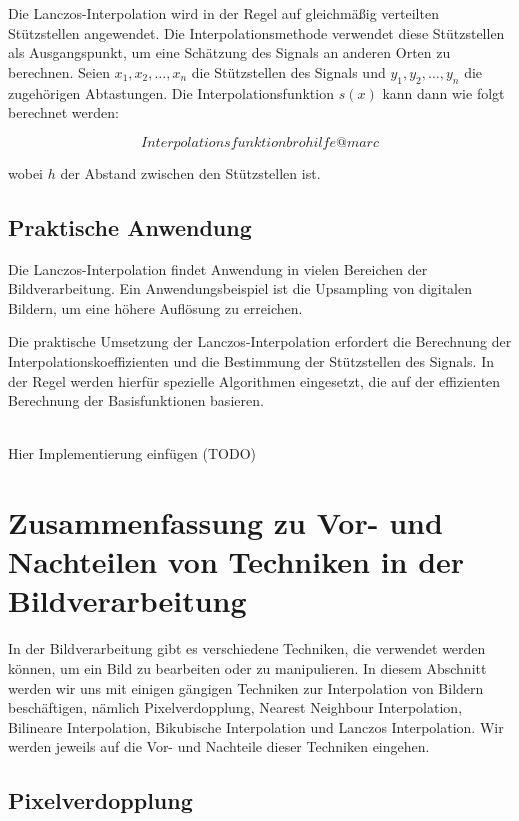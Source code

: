 Die Lanczos-Interpolation wird in der Regel auf gleichmäßig verteilten Stützstellen angewendet. 
Die Interpolationsmethode verwendet diese Stützstellen als Ausgangspunkt, um eine Schätzung des Signals an anderen Orten zu berechnen. 
Seien $x_1, x_2, \ldots, x_n$ die Stützstellen des Signals und $y_1, y_2, \ldots, y_n$ die zugehörigen Abtastungen. Die Interpolationsfunktion $s(x)$ kann dann wie folgt berechnet werden:

\begin{equation}
Interpolationsfunktion bro hilfe @marc
\end{equation}

wobei $h$ der Abstand zwischen den Stützstellen ist.

\subsection{Praktische Anwendung}

Die Lanczos-Interpolation findet Anwendung in vielen Bereichen der Bildverarbeitung. 
Ein Anwendungsbeispiel ist die Upsampling von digitalen Bildern, um eine höhere Auflösung zu erreichen.

Die praktische Umsetzung der Lanczos-Interpolation erfordert die Berechnung der Interpolationskoeffizienten und die Bestimmung der Stützstellen des Signals. 
In der Regel werden hierfür spezielle Algorithmen eingesetzt, die auf der effizienten Berechnung der Basisfunktionen basieren.

\\Hier Implementierung einfügen (TODO) 

\section{Zusammenfassung zu Vor- und Nachteilen von Techniken in der Bildverarbeitung}

In der Bildverarbeitung gibt es verschiedene Techniken, die verwendet werden können, um ein Bild zu bearbeiten oder zu manipulieren. 
In diesem Abschnitt werden wir uns mit einigen gängigen Techniken zur Interpolation von Bildern beschäftigen, nämlich Pixelverdopplung, Nearest Neighbour Interpolation, Bilineare Interpolation, Bikubische Interpolation und Lanczos Interpolation. 
Wir werden jeweils auf die Vor- und Nachteile dieser Techniken eingehen.

\subsection{Pixelverdopplung}

